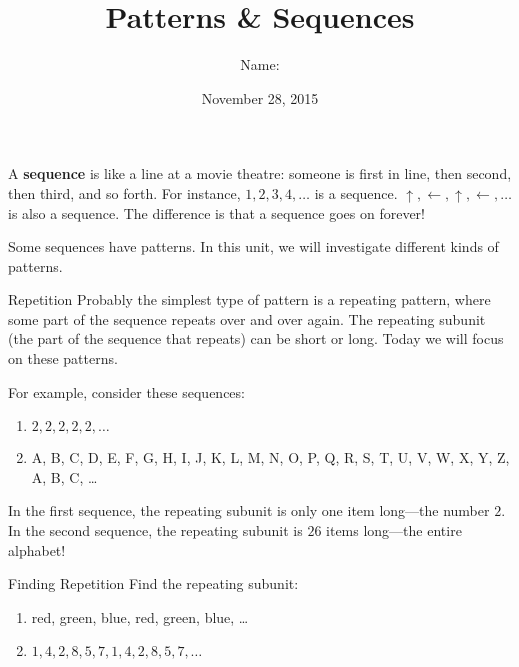 \documentclass[12pt,letterpaper]{article}
\title{Patterns \& Sequences}
\author{Name: \underline{\hspace{5cm}}}
\date{November 28, 2015}
\begin{document}
\maketitle

\thispagestyle{empty}

A \textbf{sequence} is like a line at a movie theatre: someone is first in line,
then second, then third, and so forth. For instance, $1, 2, 3, 4, \ldots$ is a
sequence. $\uparrow, \leftarrow, \uparrow, \leftarrow, \ldots$ is also a
sequence. The difference is that a sequence goes on forever!

Some sequences have patterns. In this unit, we will investigate different kinds
of patterns.

\begin{step}{Repetition}
Probably the simplest type of pattern is a repeating pattern, where some part of
the sequence repeats over and over again. The repeating subunit (the part of the
sequence that repeats) can be short or long. Today we will focus on these
patterns.

For example, consider these sequences:

\begin{enumerate}
\item $2, 2, 2, 2, 2, \ldots$
\item A, B, C, D, E, F, G, H, I, J, K, L, M, N, O, P, Q, R, S, T, U, V, W, X,
Y, Z, A, B, C, \ldots
\end{enumerate}

In the first sequence, the repeating subunit is only one item long---the number
$2$. In the second sequence, the repeating subunit is $26$ items long---the
entire alphabet!
\end{step}

\begin{problem}{Finding Repetition}
Find the repeating subunit:

\begin{enumerate}[\hspace{.5cm}a.]
\item red, green, blue, red, green, blue, \ldots
\item $1, 4, 2, 8, 5, 7, 1, 4, 2, 8, 5, 7, \ldots$
\end{enumerate}
\end{problem}
\end{document}
